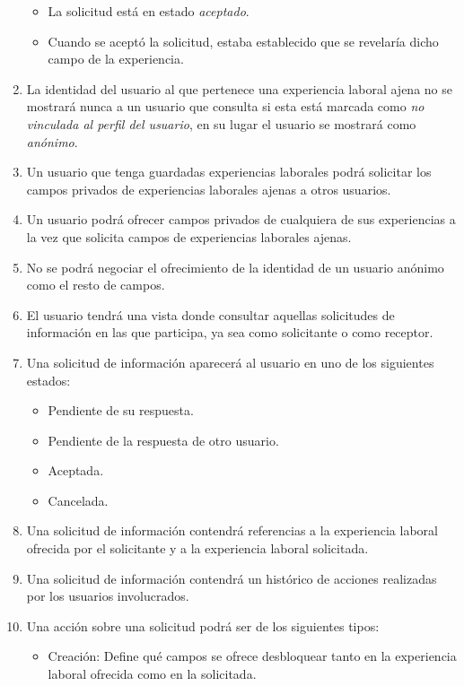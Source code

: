 \documentclass[a4paper, 12pt]{book}
\begin{document}
\begin{enumerate}
\begin{itemize}
            \item La solicitud está en estado \emph{aceptado}.
            \item Cuando se aceptó la solicitud, estaba establecido que se revelaría dicho campo de la experiencia.
        \end{itemize}
        \item La identidad del usuario al que pertenece una experiencia laboral ajena
        no se mostrará nunca a un usuario que consulta si esta está marcada como \emph{no vinculada al perfil del usuario},
        en su lugar el usuario se mostrará como \emph{anónimo}.
        \item Un usuario que tenga guardadas experiencias laborales podrá solicitar los campos privados de experiencias laborales ajenas a otros usuarios.
        \item Un usuario podrá ofrecer campos privados de cualquiera de sus experiencias a la vez que solicita campos de experiencias laborales ajenas.
        \item No se podrá negociar el ofrecimiento de la identidad de un usuario anónimo como el resto de campos.
        \item El usuario tendrá una vista donde consultar aquellas solicitudes de información en las que participa, ya sea como solicitante o como receptor.
        \item Una solicitud de información aparecerá al usuario en uno de los siguientes estados:
        \begin{itemize}
            \item Pendiente de su respuesta.
            \item Pendiente de la respuesta de otro usuario.
            \item Aceptada.
            \item Cancelada.
        \end{itemize}
        \item Una solicitud de información contendrá referencias a la experiencia laboral ofrecida por el solicitante y a la experiencia laboral solicitada.
        \item Una solicitud de información contendrá un histórico de acciones realizadas por los usuarios involucrados.
        \item Una acción sobre una solicitud podrá ser de los siguientes tipos:
        \begin{itemize}
            \item Creación: Define qué campos se ofrece desbloquear tanto en la experiencia laboral ofrecida como en la solicitada.

\end{itemize}
\end{enumerate}
\end{document}
